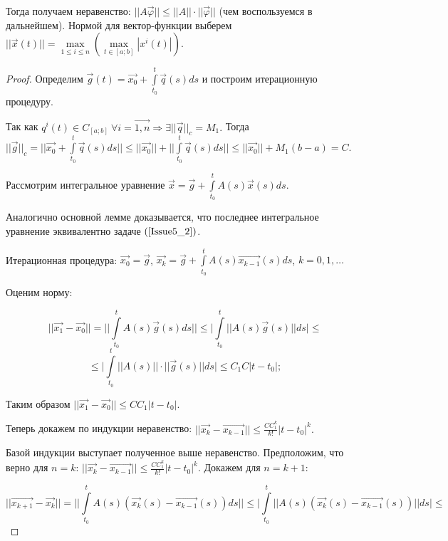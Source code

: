Тогда получаем неравенство: $||A \overrightarrow{\varphi}|| \leqslant ||A|| \cdot ||\overrightarrow{\varphi}||$ (чем воспользуемся в дальнейшем).
Нормой для вектор-функции выберем $||\overrightarrow{x}(t)|| = \max\limits_{1 \leqslant i \leqslant n} (\max\limits_{t \in [a;b]} |x^i(t)|)$.

\begin{proof}

Определим $\overrightarrow{g}(t) = \overrightarrow{x_0} + \int\limits_{t_0}^{t} \overrightarrow{q}(s)ds$ и построим итерационную процедуру.

Так как $q^i(t) \in C_{[a;b]}\ \forall i = \overrightarrow{1, n} \Rightarrow \exists ||\overrightarrow{q}||_c = M_1.$ Тогда $||\overrightarrow{g}||_c = \Big| \Big|\overrightarrow{x_0} + \int\limits_{t_0}^{t}\overrightarrow{q}(s)ds \Big| \Big| \leqslant ||\overrightarrow{x_0}|| + \Big| \Big| \int\limits_{t_0}^{t}\overrightarrow{q}(s)ds \Big| \Big| \leqslant ||\overrightarrow{x_0}|| + M_1(b-a) = C.$

Рассмотрим интегральное уравнение $\overrightarrow{x} = \overrightarrow{g} + \int\limits_{t_0}^{t}A(s)\overrightarrow{x}(s)ds$.

Аналогично основной лемме доказывается, что последнее интегральное уравнение эквивалентно задаче $(\ref{Issue5_2})$.

Итерационная процедура: $\overrightarrow{x_0} = \overrightarrow{g}$, $\overrightarrow{x_k} = \overrightarrow{g} + \int\limits_{t_0}^{t} A(s)\overrightarrow{x_{k-1}}(s)ds $, $k = 0, 1, \dots$

Оценим норму:

$$ ||\overrightarrow{x_1} - \overrightarrow{x_0}|| = \Big| \Big| \int\limits_{t_0}^{t} A(s)\overrightarrow{g}(s)ds \Big| \Big| \leqslant \Big| \int\limits_{t_0}^{t} || A(s)\overrightarrow{g}(s) || ds \Big| \leqslant $$
$$\leqslant \Big| \int\limits_{t_0}^{t} || A(s) || \cdot || \overrightarrow{g}(s) || ds \Big| \leqslant C_1 C |t - t_0|;$$ 

Таким образом $||\overrightarrow{x_1} -\overrightarrow{x_0}|| \leqslant CC_1|t-t_0|.$

Теперь докажем по индукции неравенство: $||\overrightarrow{x_k} - \overrightarrow{x_{k-1}}|| \leqslant \frac{CC_1^k}{k!}|t-t_0|^k.$

Базой индукции выступает полученное выше неравенство. Предположим, что верно для $n = k$: $||\overrightarrow{x_k} - \overrightarrow{x_{k-1}}|| \leqslant \frac{CC_1^k}{k!}|t-t_0|^k$. Докажем для $n = k + 1$:

\[ || \overrightarrow{x_{k+1}} - \overrightarrow{x_{k}} || = \Big| \Big| \int\limits_{t_0}^{t} A(s)(\overrightarrow{x_k}(s) - \overrightarrow{x_{k-1}}(s))ds \Big| \Big| \leqslant \Big| \int\limits_{t_0}^{t} ||A(s)(\overrightarrow{x_k}(s) - \overrightarrow{x_{k-1}}(s))|| ds \Big| \leqslant \]


\end{proof}
